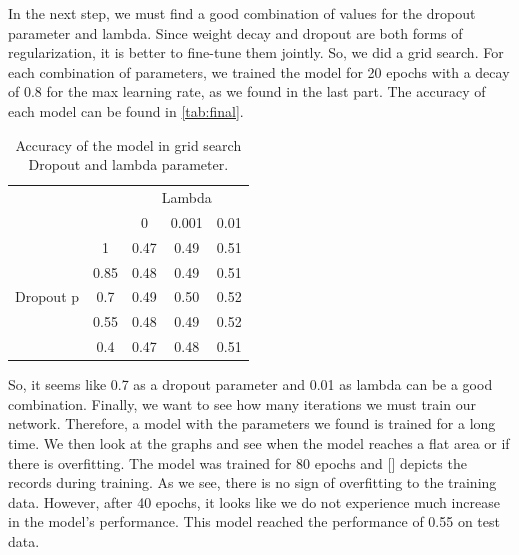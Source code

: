 \documentclass[a4paper]{article}
\begin{document}
In the next step, we must find a good combination of values for the dropout parameter and lambda. Since weight decay and dropout are both forms of regularization, it is better to fine-tune them jointly. So, we did a grid search. For each combination of parameters, we trained the model for 20 epochs with a decay of 0.8 for the max learning rate, as we found in the last part. The accuracy of each model can be found in \autoref{tab:final}.




\begin{table}[h]
	\centering
	\caption{Accuracy of the model in grid search Dropout and lambda parameter.}
	\label{tab:final}
	\begin{tabular}{|c|c|c|c|c|} 
		\cline{3-5}
		\multicolumn{2}{c|}{\multirow{2}{*}{}} & \multicolumn{3}{c|}{Lambda}  \\ 
		\cline{3-5}
		\multicolumn{2}{c|}{}                  & 0    & 0.001 & 0.01          \\ 
		\hline
		\multirow{5}{*}{Dropout p} & 1         & 0.47 & 0.49  & 0.51          \\ 
		\cline{2-5}
		& 0.85      & 0.48 & 0.49  & 0.51          \\ 
		\cline{2-5}
		& 0.7       & 0.49 & 0.50  & 0.52          \\ 
		\cline{2-5}
		& 0.55      & 0.48 & 0.49  & 0.52          \\ 
		\cline{2-5}
		& 0.4       & 0.47 & 0.48  & 0.51          \\
		\hline
	\end{tabular}
\end{table}

So, it seems like 0.7 as a dropout parameter and 0.01 as lambda can be a good combination. Finally, we want to see how many iterations we must train our network. Therefore, a model with the parameters we found is trained for a long time. We then look at the graphs and see when the model reaches a flat area or if there is overfitting. The model was trained for 80 epochs and [] depicts the records during training. As we see, there is no sign of overfitting to the training data. However, after 40 epochs, it looks like we do not experience much increase in the model's performance. This model reached the performance of 0.55 on test data.
\end{document}
